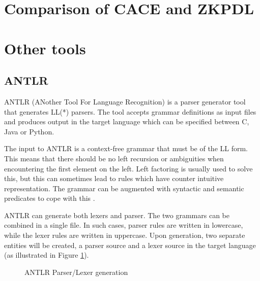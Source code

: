\filbreak

\section{Comparison of CACE and ZKPDL}

\filbreak

\section{Other tools}

\subsection{ANTLR}

ANTLR (ANother Tool For Language Recognition) is a parser generator
tool that generates LL(*) parsers. The tool accepts grammar
definitions as input files and produces output in the target language
which can be specified between C, Java or Python.

The input to ANTLR is a context-free grammar that must be of the LL
form. This means that there should be no left recursion or ambiguities
when encountering the first element on the left. Left factoring is
usually used to solve this, but this can sometimes lead to rules which
have counter intuitive representation. The grammar can be augmented with
syntactic and semantic predicates to cope with this \cite{ANTLR,ANTLR2}.

ANTLR can generate both lexers and parser. The two grammars can be
combined in a single file.  In such cases, parser rules are written in
lowercase, while the lexer rules are written in uppercase. Upon
generation, two separate entities will be created, a parser source and
a lexer source in the target language (as illustrated in Figure
\ref{fig:antlr_parser_lexer}).

\filbreak

\begin{figure}[hbt!]
  \centering
  \caption{ANTLR Parser/Lexer generation}
  \label{fig:antlr_parser_lexer}
\end{figure}

